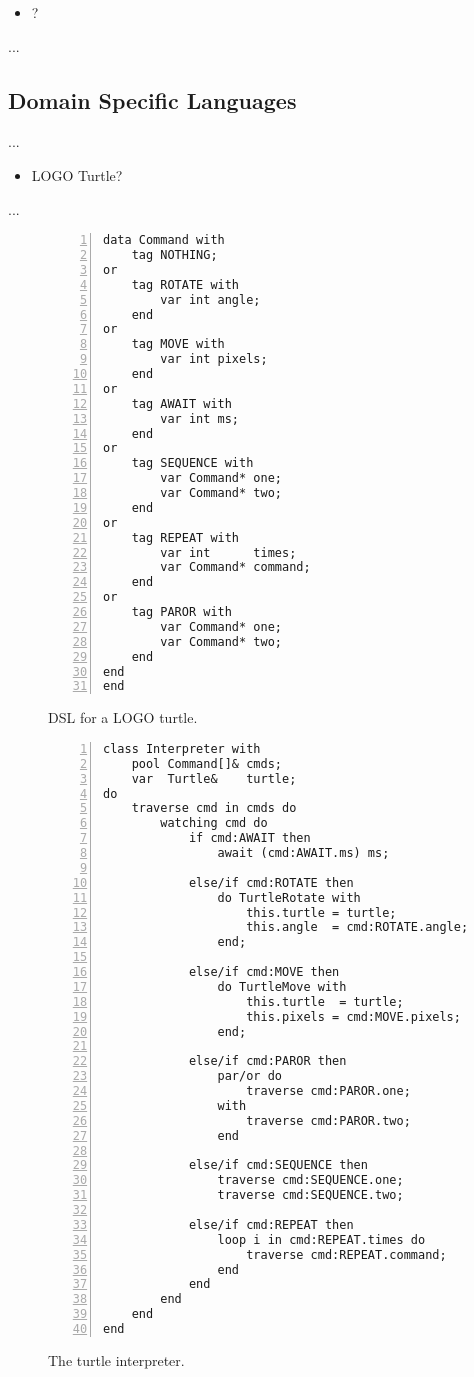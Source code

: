 \documentclass{acm_proc_article-sp}
\begin{document}
\begin{itemize}
\item ?
\end{itemize}

...

\subsection{Domain Specific Languages}

...

\begin{itemize}
\item LOGO Turtle?
\end{itemize}

...

\begin{figure}%
\begin{lstlisting}[numbers=left,xleftmargin=3em]
data Command with
    tag NOTHING;
or
    tag ROTATE with
        var int angle;
    end
or
    tag MOVE with
        var int pixels;
    end
or
    tag AWAIT with
        var int ms;
    end
or
    tag SEQUENCE with
        var Command* one;
        var Command* two;
    end
or
    tag REPEAT with
        var int      times;
        var Command* command;
    end
or
    tag PAROR with
        var Command* one;
        var Command* two;
    end
end
end
\end{lstlisting}
\caption{ DSL for a LOGO turtle.
\label{lst.turtle.dsl}
}
\end{figure}

\begin{figure}%
\begin{lstlisting}[numbers=left,xleftmargin=3em]
class Interpreter with
    pool Command[]& cmds;
    var  Turtle&    turtle;
do
    traverse cmd in cmds do
        watching cmd do
            if cmd:AWAIT then
                await (cmd:AWAIT.ms) ms;

            else/if cmd:ROTATE then
                do TurtleRotate with
                    this.turtle = turtle;
                    this.angle  = cmd:ROTATE.angle;
                end;

            else/if cmd:MOVE then
                do TurtleMove with
                    this.turtle  = turtle;
                    this.pixels = cmd:MOVE.pixels;
                end;

            else/if cmd:PAROR then
                par/or do
                    traverse cmd:PAROR.one;
                with
                    traverse cmd:PAROR.two;
                end

            else/if cmd:SEQUENCE then
                traverse cmd:SEQUENCE.one;
                traverse cmd:SEQUENCE.two;

            else/if cmd:REPEAT then
                loop i in cmd:REPEAT.times do
                    traverse cmd:REPEAT.command;
                end
            end
        end
    end
end
\end{lstlisting}
\caption{ The turtle interpreter.
\label{lst.turtle.interpreter}
}
\end{figure}
\end{document}
